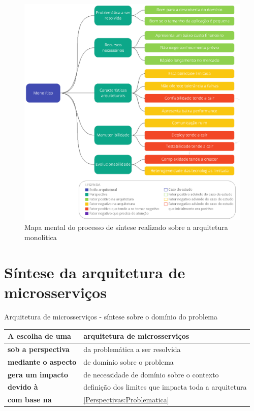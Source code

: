 \begin{figure}[h]
  \centering
  \includegraphics[keepaspectratio=true,scale=1]{figuras/sintese-monolitico.eps}
  \caption{Mapa mental do processo de síntese realizado sobre a arquitetura monolítica\label{fig:SinteseMono}}
\end{figure}
\newpage

\section{Síntese da arquitetura de microsserviços}

\begin{quadro}
    \caption{Arquitetura de microsserviços - síntese sobre o domínio do problema\label{microsservicos:sintese-dominio}}
    \begin{tabularx}{\linewidth}{ | p{5cm} | X | }
    \hline
    \textbf{A escolha de uma}       & arquitetura de microsserviços \\ \hline
    \textbf{sob a perspectiva}      & da problemática a ser resolvida \\ \hline
    \textbf{mediante o aspecto}     & de domínio sobre o problema \\ \hline
    \textbf{gera um impacto}        & de necessidade de domínio sobre o contexto\\ \hline
    \textbf{devido à }              & definição dos limites que impacta toda a arquitetura \\ \hline
    \textbf{com base na}            & \autoref{Perspectivas:Problematica} \\ \hline
    \end{tabularx}
\end{quadro}

